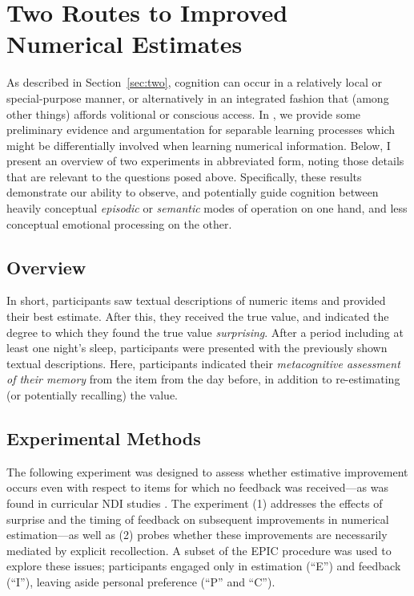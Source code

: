 \graphicspath{{two-routes-estimation/}}

\chapter{Two Routes to Improved Numerical Estimates}
\label{chap:two}

As described in Section~\ref{sec:two}, cognition can occur in a relatively local
or special-purpose manner, or alternatively in an integrated fashion that (among
other things) affords volitional or conscious access. In
\textcite{clark_known_2010}, we provide some preliminary evidence and argumentation
for separable learning processes which might be differentially involved when
learning numerical information. Below, I present an overview of two experiments
in abbreviated form, noting those details that are relevant to the questions
posed above. Specifically, these results demonstrate our ability to observe, and
potentially guide cognition between heavily conceptual \emph{episodic} or
\emph{semantic} modes of operation on one hand, and less conceptual emotional
processing on the other.

\section{Overview}

In short, participants saw textual descriptions of numeric items and provided
their best estimate. After this, they received the true value, and indicated the
degree to which they found the true value \emph{surprising}. After a period
including at least one night's sleep, participants were presented with the
previously shown textual descriptions.  Here, participants indicated their
\emph{metacognitive assessment of their memory} from the item from the day
before, in addition to re-estimating (or potentially recalling) the value.

\section{Experimental Methods}

The following experiment was designed to assess whether estimative improvement
occurs even with respect to items for which no feedback was received---as was
found in curricular NDI studies
\parencite[e.g.,][]{munnich_numerically-driven_2004,ranney_designing_2008}. The
experiment (1) addresses the effects of surprise and the timing of feedback on
subsequent improvements in numerical estimation---as well as (2) probes whether
these improvements are necessarily mediated by explicit recollection. A subset
of the EPIC procedure was used to explore these issues; participants engaged
only in estimation (``E'') and feedback (``I''), leaving aside personal
preference (``P'' and ``C''). 

